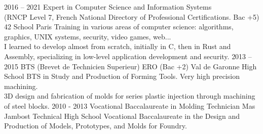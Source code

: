 \documentclass[8pt]{developercv} %
\begin{document}
\vspace{-1.2\baselineskip} %

\begin{entrylist}
	\entry
		{2016 -- 2021}
		{Expert in Computer Science and Information Systems\\\footnotesize{(RNCP Level 7, French National Directory of Professional Certifications. Bac +5)}}
		{42 School Paris}
		{
			Training in various areas of computer science: algorithms, graphics, UNIX systems, security, video games, web...\\
			I learned to develop almost from scratch, initially in C, then in Rust and Assembly, specializing in low-level application development and security.
		}
	\entry
		{2013 -- 2015}
		{BTS (Brevet de Technicien Superieur) ERO \footnotesize{(Bac +2)}}
		{Val de Garonne High School}
		{
			BTS in Study and Production of Forming Tools. Very high precision machining.\\
			3D design and fabrication of molds for series plastic injection through machining of steel blocks.
		}
	\entry
		{2010 - 2013}
		{Vocational Baccalaureate in Molding Technician}
		{Mas Jambost Technical High School}
		{
			Vocational Baccalaureate in the Design and Production of Models, Prototypes, and Molds for Foundry.
		}
\end{entrylist}
\end{document}

